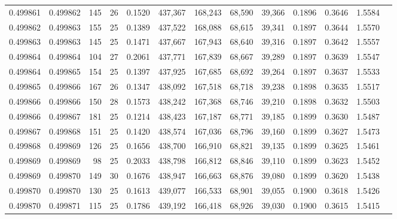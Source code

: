 \begin{tabular}{rrrrrrrrrrrrr}
0.499861 & 0.499862 & 145 &  26 &                                     0.1520 & 437,367 & 168,243 &  68,590 &  39,366 & 0.1896 & 0.3646 & 1.5584 \\
0.499862 & 0.499863 & 155 &  25 &                                     0.1389 & 437,522 & 168,088 &  68,615 &  39,341 & 0.1897 & 0.3644 & 1.5570 \\
0.499863 & 0.499863 & 145 &  25 &                                     0.1471 & 437,667 & 167,943 &  68,640 &  39,316 & 0.1897 & 0.3642 & 1.5557 \\
0.499864 & 0.499864 & 104 &  27 &                                     0.2061 & 437,771 & 167,839 &  68,667 &  39,289 & 0.1897 & 0.3639 & 1.5547 \\
0.499864 & 0.499865 & 154 &  25 &                                     0.1397 & 437,925 & 167,685 &  68,692 &  39,264 & 0.1897 & 0.3637 & 1.5533 \\
0.499865 & 0.499866 & 167 &  26 &                                     0.1347 & 438,092 & 167,518 &  68,718 &  39,238 & 0.1898 & 0.3635 & 1.5517 \\
0.499866 & 0.499866 & 150 &  28 &                                     0.1573 & 438,242 & 167,368 &  68,746 &  39,210 & 0.1898 & 0.3632 & 1.5503 \\
0.499866 & 0.499867 & 181 &  25 &                                     0.1214 & 438,423 & 167,187 &  68,771 &  39,185 & 0.1899 & 0.3630 & 1.5487 \\
0.499867 & 0.499868 & 151 &  25 &                                     0.1420 & 438,574 & 167,036 &  68,796 &  39,160 & 0.1899 & 0.3627 & 1.5473 \\
0.499868 & 0.499869 & 126 &  25 &                                     0.1656 & 438,700 & 166,910 &  68,821 &  39,135 & 0.1899 & 0.3625 & 1.5461 \\
0.499869 & 0.499869 &  98 &  25 &                                     0.2033 & 438,798 & 166,812 &  68,846 &  39,110 & 0.1899 & 0.3623 & 1.5452 \\
0.499869 & 0.499870 & 149 &  30 &                                     0.1676 & 438,947 & 166,663 &  68,876 &  39,080 & 0.1899 & 0.3620 & 1.5438 \\
0.499870 & 0.499870 & 130 &  25 &                                     0.1613 & 439,077 & 166,533 &  68,901 &  39,055 & 0.1900 & 0.3618 & 1.5426 \\
0.499870 & 0.499871 & 115 &  25 &                                     0.1786 & 439,192 & 166,418 &  68,926 &  39,030 & 0.1900 & 0.3615 & 1.5415 \\

\end{tabular}
